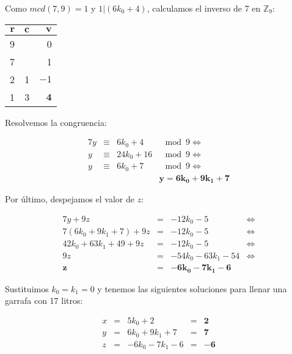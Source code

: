 Como $mcd(7,9) = 1$ y $1|(6k_0 + 4)$, calculamos el inverso de 7 en $\mathbb{Z}_9$:

\begin{center}
\begin{tabular}{r r r}
	$\boldsymbol{r}$ & $\boldsymbol{c}$ & $\boldsymbol{v}$  \\
	\toprule
	9                &                  & 0                 \\
	7                &                  & 1                 \\
	2                & 1                & $-1$              \\
	1                & 3                & $\boldsymbol{4}$
\end{tabular}
\end{center}

Resolvemos la congruencia:

\[
\begin{array}{rcrl}
	7y & \equiv & 6k_0 + 4   & \mod 9 \iff \\
	y  & \equiv & 24k_0 + 16 & \mod 9 \iff \\
	y  & \equiv & 6k_0 + 7   & \mod 9 \iff \\
      &        &            & \boldsymbol{y = 6k_0 + 9k_1 + 7}
\end{array}
\]

Por último, despejamos el valor de $z$:

\[
\begin{array}{rcll}
	7y + 9z                 & =              & -12k_0 - 5                    & \iff \\
	7(6k_0 + 9k_1 + 7) + 9z & =              & -12k_0 - 5                    & \iff \\
	42k_0 + 63k_1 + 49 + 9z & =              & -12k_0 - 5                    & \iff \\
	9z                      & =              & -54k_0 - 63k_1 - 54           & \iff \\
	\boldsymbol{z}          & \boldsymbol{=} & \boldsymbol{-6k_0 - 7k_1 - 6} &
\end{array}
\]

Sustituimos $k_0 = k_1 = 0$ y tenemos las siguientes soluciones para llenar una garrafa con 17 litros:

\[
\begin{array}{rclcr}
	x & = & 5k_0 + 2         & = & \boldsymbol{2} \\
	y & = & 6k_0 + 9k_1 + 7  & = & \boldsymbol{7} \\
	z & = & -6k_0 - 7k_1 - 6 & = & \boldsymbol{-6}
\end{array}
\]


